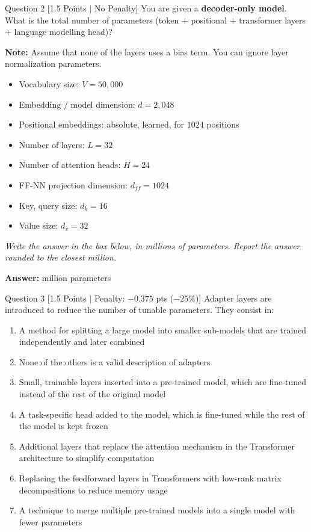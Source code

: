 \documentclass[11pt,a4paper]{article}
\begin{document}
\vspace{6pt}

\begin{questionbox}{Question 2 \hfill [1.5 Points $\vert$ No Penalty]}
You are given a \textbf{decoder-only model}. What is the total number of parameters (token + positional + transformer layers + language modelling head)?

\textbf{Note:} Assume that none of the layers uses a bias term. You can ignore layer normalization parameters.
\begin{itemize}[leftmargin=1.5cm,itemsep=1pt]
    \item Vocabulary size: $V = 50{,}000$
    \item Embedding / model dimension: $d = 2{,}048$
    \item Positional embeddings: absolute, learned, for $1024$ positions
    \item Number of layers: $L = 32$
    \item Number of attention heads: $H = 24$
    \item FF-NN projection dimension: $d_{ff} = 1024$
    \item Key, query size: $d_k = 16$
    \item Value size: $d_v = 32$
\end{itemize}
\textit{Write the answer in the box below, in millions of parameters. Report the answer rounded to the closest million.}

\begin{center}
\textbf{Answer:} \underline{\hspace{3cm}} million parameters
\end{center}
\end{questionbox}

\newpage

\begin{questionbox}{Question 3 \hfill [1.5 Points $\vert$ Penalty: $-0.375$ pts ($-25\%$)]}
Adapter layers are introduced to reduce the number of tunable parameters. They consist in:
\begin{enumerate}[label=\alph*.,leftmargin=1.2cm,itemsep=3pt]
    \item A method for splitting a large model into smaller sub-models that are trained independently and later combined
    \item None of the others is a valid description of adapters
    \item Small, trainable layers inserted into a pre-trained model, which are fine-tuned instead of the rest of the original model
    \item A task-specific head added to the model, which is fine-tuned while the rest of the model is kept frozen
    \item Additional layers that replace the attention mechanism in the Transformer architecture to simplify computation
    \item Replacing the feedforward layers in Transformers with low-rank matrix decompositions to reduce memory usage
    \item A technique to merge multiple pre-trained models into a single model with fewer parameters
\end{enumerate}
\end{questionbox}
\end{document}
